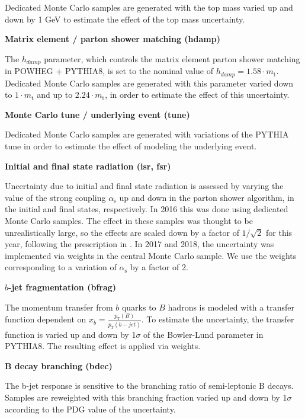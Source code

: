 Dedicated Monte Carlo samples are generated with the top mass varied up and down by 1 \unit{GeV} to estimate the effect of the top mass uncertainty. 

\par \noindent
\textbf{Matrix element / parton shower matching (hdamp)}

The $h_{damp}$ parameter, which controls the matrix element parton shower matching in \small\textsc{POWHEG + PYTHIA8}, is set to the nominal value of $h_{damp}= 1.58 \cdot m_\mathrm{t}$. Dedicated Monte Carlo samples are generated with this parameter varied down to $1 \cdot m_\mathrm{t}$ and up to $2.24 \cdot m_\mathrm{t}$, in order to estimate the effect of this uncertainty.

\par \noindent
\textbf{Monte Carlo tune / underlying event (tune)}

Dedicated Monte Carlo samples are generated with variations of the PYTHIA tune in order to estimate the effect of modeling the underlying event.
\par \noindent
\textbf{Initial and final state radiation (isr, fsr)}

Uncertainty due to initial and final state radiation is assessed by varying the value of the strong coupling $\alpha_\mathrm{s}$ up and down in the parton shower algorithm, in the initial and final states, respectively. In 2016 this was done using dedicated Monte Carlo samples. The effect in these samples was thought to be unrealistically large, so the effects are scaled down by a factor of $1/\sqrt{2}$ for this year, following the prescription in \cite{Skands:2014pea}. In 2017 and 2018, the uncertainty was implemented via weights in the central Monte Carlo sample. We use the weights corresponding to a variation of $\alpha_\mathrm{s}$ by a factor of 2.

\par \noindent
\textbf{$b$-jet fragmentation (bfrag)} 

The momentum transfer from $b$ quarks to $B$ hadrons is modeled with a transfer function dependent on $x_b=\frac{p_T(B)}{p_T(b-jet)}$. To estimate the uncertainty, the transfer function is varied up and down by 1$\sigma$ of the Bowler-Lund parameter in PYTHIA8. The resulting effect is applied via weights.


\par \noindent
\textbf{B decay branching (bdec)} 

The b-jet response is sensitive to the branching ratio of semi-leptonic B decays. Samples are reweighted with this branching fraction varied up and down by 1$\sigma$ according to the PDG value of the uncertainty. 

